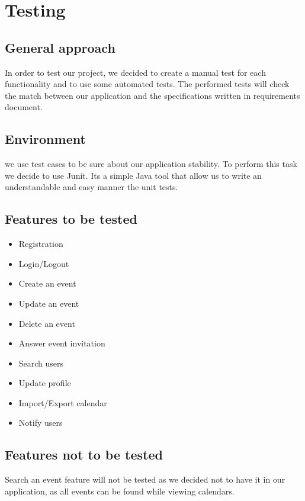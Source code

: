 \section{Testing}
\subsection{General approach}
\par In order to test our project, we decided to create a manual test for each functionality and to use some automated tests. The performed tests will check the match between our application and the specifications written in requirements document.
\subsection{Environment}
we use test cases to be sure about our application stability. To perform this task we decide to use Junit.  Its a simple Java tool that allow us to write an understandable and easy manner the unit tests.
\subsection{Features to be tested}
\par \begin{itemize}
       \item Registration
       \item Login/Logout
       \item Create an event
       \item Update an event
       \item Delete an event
       \item Answer event invitation
       \item Search users
       \item Update profile
       \item Import/Export calendar
       \item Notify users
     \end{itemize}
\subsection{Features not to be tested}
\par Search an event feature will not be tested as we decided not to have it in our application, as all events can be found while viewing calendars. 
